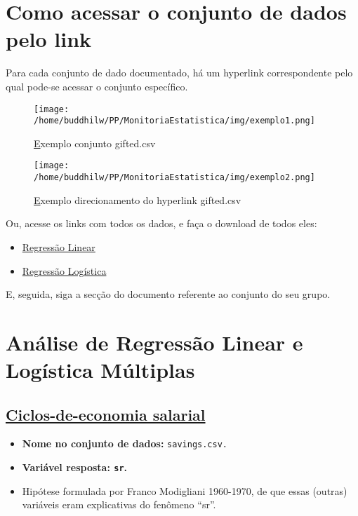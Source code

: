 \documentclass[11pt]{article}
\date{\today}
\title{}
\begin{document}
\tableofcontents
\clearpage


\section{Como acessar o conjunto de dados pelo link}
\label{sec:org484c5e1}
Para cada conjunto de dado documentado, há um hyperlink correspondente
pelo qual pode-se acessar o conjunto específico.

{\begin{figure}[!htbp]
    \caption{\href{img/exemplo1.png} Exemplo conjunto gifted.csv}
    \centering
    \texttt{[image: /home/buddhilw/PP/MonitoriaEstatistica/img/exemplo1.png]}
\end{figure}}


{\begin{figure}[!htbp]
    \centering
    \caption{\href{img/exemplo2.png}Exemplo direcionamento do hyperlink gifted.csv}
    \texttt{[image: /home/buddhilw/PP/MonitoriaEstatistica/img/exemplo2.png]}
\end{figure}}

Ou, acesse os links com todos os dados, e faça o download de todos eles:
\begin{itemize}
\item \href{https://drive.google.com/drive/folders/1SaXLjwvKd\_z6xSQRIs6rxKnOJ7uQguSW?usp=sharing}{Regressão Linear}
\item \href{https://drive.google.com/drive/folders/1BtrKdgg1WzPDfKrSNckv8RcF8DWt-W3F?usp=sharing}{Regressão Logística}
\end{itemize}

E, seguida, siga a secção do documento referente ao conjunto do seu grupo.

\clearpage

\section{Análise de Regressão Linear e Logística Múltiplas}
\label{sec:orgcbd9a65}

\subsection{\href{https://r-data.pmagunia.com/dataset/r-dataset-package-datasets-lifecyclesavings}{Ciclos-de-economia salarial}}
\label{sec:orgb7d5a65}
\begin{itemize}
\item \textbf{Nome no conjunto de dados:} \texttt{savings.csv.}
\item \textbf{Variável resposta: \texttt{sr}.}
\item Hipótese formulada por Franco Modigliani 1960-1970, de que essas (outras)
variáveis eram explicativas do fenômeno ``sr''.
\end{itemize}
\end{document}
